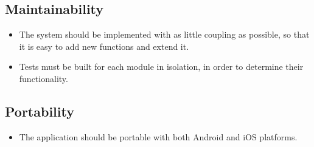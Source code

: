 \subsection{Maintainability}
\begin{itemize}
    \item The system should be implemented with as little coupling as possible, so that it is easy to add new functions and extend it.
    \item Tests must be built for each module in isolation, in order to determine their functionality. 
\end{itemize}
\subsection{Portability}
    \begin{itemize}
        \item The application should be portable with both Android and iOS platforms.
    \end{itemize}         

